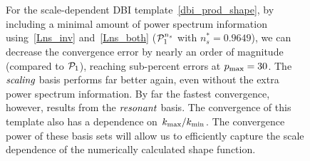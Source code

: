 \begin{figure}[!pth]
\centering
\\
\\
\caption{
    For the scale-dependent DBI template~\eqref{dbi_prod_shape},
    by including a minimal amount of power spectrum information
    using~\eqref{Lns_inv} and~\eqref{Lns_both} ($\mathcal{P}^{n_s}_1$ with
    $n_s^{*}=0.9649$), we can decrease the convergence error
    by nearly an order of magnitude (compared to $\mathcal{P}_1$), reaching sub-percent errors at $p_\text{max}=30$.
    The $\textit{scaling}$ basis performs far better again, even without the extra
    power spectrum information.
    By far the fastest convergence, however, results from the $\textit{resonant}$ basis.
    The convergence of this template also has a dependence on ${k_\text{max}}/{k_\text{min}}$.
    The convergence power of these basis sets will allow us to efficiently
    capture the scale dependence of the numerically calculated shape function.
    }\label{fig:recon_dbi_ns}
\end{figure}

